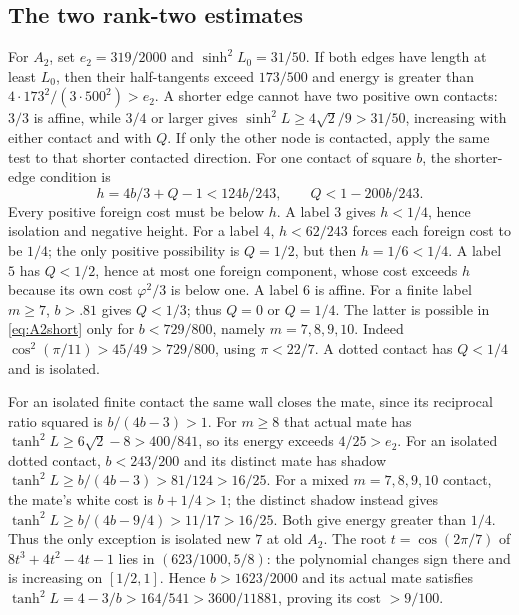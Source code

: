 \documentclass[11pt]{article}
\theoremstyle{remark}
\newcommand{\ph}{\varphi}
\begin{document}
\subsection{The two rank-two estimates}

For $A_2$, set $e_2=319/2000$ and $\sinh^2L_0=31/50$.
If both edges have length at least $L_0$, then their half-tangents
exceed $173/500$ and energy is greater than
$4\cdot173^2/(3\cdot500^2)>e_2$. A shorter edge cannot have two
positive own contacts: $3/3$ is affine, while $3/4$ or larger gives
$\sinh^2L\ge4\sqrt2/9>31/50$, increasing with either contact
and with $Q$. If only the other node is contacted, apply the same
test to that shorter contacted direction. For one contact of square
$b$, the shorter-edge condition is
\begin{equation}\label{eq:A2short}
 h=4b/3+Q-1<124b/243,\qquad Q<1-200b/243.
\end{equation}
Every positive foreign cost must be below $h$. A label $3$ gives
$h<1/4$, hence isolation and negative height. For a label $4$,
$h<62/243$ forces each foreign cost to be $1/4$; the only positive
possibility is $Q=1/2$, but then $h=1/6<1/4$. A label $5$ has
$Q<1/2$, hence at most one foreign component, whose cost exceeds
$h$ because its own cost $\ph^2/3$ is below one. A label $6$ is
affine. For a finite label $m\ge7$, $b>.81$ gives $Q<1/3$;
thus $Q=0$ or $Q=1/4$. The latter is possible in
\eqref{eq:A2short} only for $b<729/800$, namely $m=7,8,9,10$.
Indeed $\cos^2(\pi/11)>45/49>729/800$, using $\pi<22/7$.
A dotted contact has $Q<1/4$ and is isolated.

For an isolated finite contact the same wall closes the mate,
since its reciprocal ratio squared is $b/(4b-3)>1$.
For $m\ge8$ that actual mate has
$\tanh^2L\ge6\sqrt2-8>400/841$, so its energy exceeds
$4/25>e_2$. For an isolated dotted contact,
$b<243/200$ and its distinct mate has shadow
$\tanh^2L\ge b/(4b-3)>81/124>16/25$.
For a mixed $m=7,8,9,10$ contact, the mate's white cost is
$b+1/4>1$; the distinct shadow instead gives
$\tanh^2L\ge b/(4b-9/4)>11/17>16/25$.
Both give energy greater than $1/4$. Thus the only exception is
isolated new $7$ at old $A_2$.
The root $t=\cos(2\pi/7)$ of $8t^3+4t^2-4t-1$ lies in
$(623/1000,5/8)$: the polynomial changes sign there and is increasing
on $[1/2,1]$. Hence $b>1623/2000$ and its actual mate satisfies
$\tanh^2L=4-3/b>164/541>3600/11881$, proving its cost $>9/100$.
\end{document}

